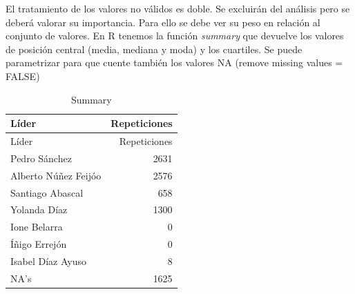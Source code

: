 \documentclass[
  12 pt,
  a4paper,
]{article}
\newenvironment{Shaded}{\begin{snugshade}}{\end{snugshade}}
\newcommand{\AttributeTok}[1]{\textcolor[rgb]{0.13,0.29,0.53}{#1}}
\newcommand{\CommentTok}[1]{\textcolor[rgb]{0.56,0.35,0.01}{\textit{#1}}}
\newcommand{\ConstantTok}[1]{\textcolor[rgb]{0.56,0.35,0.01}{#1}}
\newcommand{\DecValTok}[1]{\textcolor[rgb]{0.00,0.00,0.81}{#1}}
\newcommand{\FunctionTok}[1]{\textcolor[rgb]{0.13,0.29,0.53}{\textbf{#1}}}
\newcommand{\NormalTok}[1]{#1}
\newcommand{\OtherTok}[1]{\textcolor[rgb]{0.56,0.35,0.01}{#1}}
\newcommand{\SpecialCharTok}[1]{\textcolor[rgb]{0.81,0.36,0.00}{\textbf{#1}}}
\newcommand{\StringTok}[1]{\textcolor[rgb]{0.31,0.60,0.02}{#1}}
\begin{document}
El tratamiento de los valores no válidos es doble. Se excluirán del
análisis pero se deberá valorar su importancia. Para ello se debe ver su
peso en relación al conjunto de valores. En R tenemos la función
\emph{summary} que devuelve los valores de posición central (media,
mediana y moda) y los cuartiles. Se puede parametrizar para que cuente
también los valores NA (remove missing values = FALSE)

\begin{Shaded}
\end{Shaded}

\begin{Shaded}
\end{Shaded}

\begin{longtable}[]{@{}lr@{}}
\caption{Summary}\tabularnewline
\toprule\noalign{}
Líder & Repeticiones \\
\midrule\noalign{}
\endfirsthead
\toprule\noalign{}
Líder & Repeticiones \\
\midrule\noalign{}
\endhead
\bottomrule\noalign{}
\endlastfoot
Pedro Sánchez & 2631 \\
Alberto Núñez Feijóo & 2576 \\
Santiago Abascal & 658 \\
Yolanda Díaz & 1300 \\
Ione Belarra & 0 \\
Íñigo Errejón & 0 \\
Isabel Díaz Ayuso & 8 \\
NA's & 1625 \\
\end{longtable}
\end{document}
